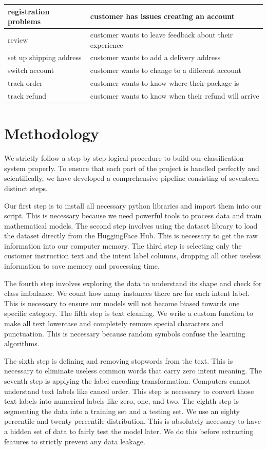 \documentclass[12pt]{article}
\begin{document}
\begin{table}[H]
{\begin{tabular}{|l|l|}
registration problems & customer has issues creating an account \\ \hline
review & customer wants to leave feedback about their experience \\ \hline
set up shipping address & customer wants to add a delivery address \\ \hline
switch account & customer wants to change to a different account \\ \hline
track order & customer wants to know where their package is \\ \hline
track refund & customer wants to know when their refund will arrive \\ \hline
\end{tabular}
}
\end{table}

\section{Methodology}
We strictly follow a step by step logical procedure to build our classification system properly. To ensure that each part of the project is handled perfectly and scientifically, we have developed a comprehensive pipeline consisting of seventeen distinct steps. 

Our first step is to install all necessary python libraries and import them into our script. This is necessary because we need powerful tools to process data and train mathematical models. The second step involves using the dataset library to load the dataset directly from the HuggingFace Hub. This is necessary to get the raw information into our computer memory. The third step is selecting only the customer instruction text and the intent label columns, dropping all other useless information to save memory and processing time. 

The fourth step involves exploring the data to understand its shape and check for class imbalance. We count how many instances there are for each intent label. This is necessary to ensure our models will not become biased towards one specific category. The fifth step is text cleaning. We write a custom function to make all text lowercase and completely remove special characters and punctuation. This is necessary because random symbols confuse the learning algorithms. 

The sixth step is defining and removing stopwords from the text. This is necessary to eliminate useless common words that carry zero intent meaning. The seventh step is applying the label encoding transformation. Computers cannot understand text labels like cancel order. This step is necessary to convert those text labels into numerical labels like zero, one, and two. The eighth step is segmenting the data into a training set and a testing set. We use an eighty percentile and twenty percentile distribution. This is absolutely necessary to have a hidden set of data to fairly test the model later. We do this before extracting features to strictly prevent any data leakage. 
\end{document}
